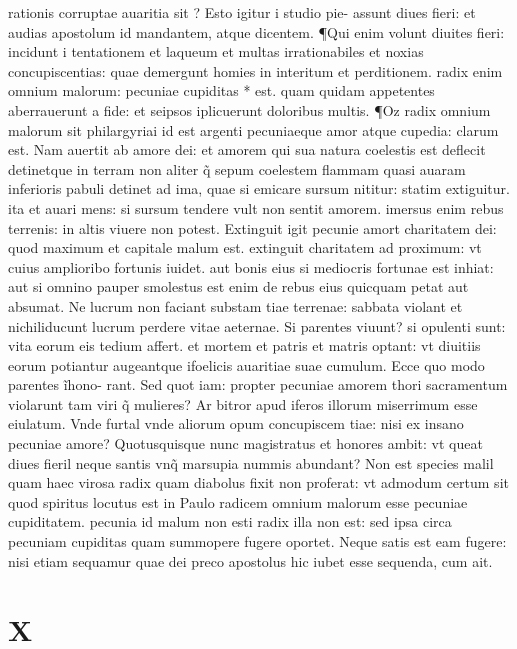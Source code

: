\documentclass{article}
\begin{document}
\begin{pages}
rationis corruptae auaritia sit ? Esto igitur i studio pie-  assunt diues fieri: et audias apostolum id mandantem, atque dicentem. ¶Qui enim volunt diuites fieri: incidunt i tentationem et laqueum et multas irrationabiles et noxias concupiscentias: quae demergunt homies in interitum et perditionem. radix enim omnium malorum: pecuniae cupiditas * est. quam quidam appetentes aberrauerunt a fide: et seipsos iplicuerunt doloribus multis. ¶Oz radix omnium malorum sit philargyriai id est argenti pecuniaeque amor atque cupedia: clarum est. Nam auertit ab amore dei: et amorem qui sua natura coelestis est deflecit detinetque in terram non aliter q̃ sepum coelestem flammam quasi auaram inferioris pabuli detinet ad ima, quae si emicare sursum nititur: statim extiguitur. ita et auari mens: si sursum tendere vult non sentit amorem. imersus enim rebus terrenis: in altis viuere non potest. Extinguit igit pecunie amort charitatem dei: quod maximum et capitale malum est. extinguit charitatem ad proximum: vt cuius amplioribo fortunis iuidet. aut bonis eius si mediocris fortunae est inhiat: aut si omnino pauper smolestus est enim de rebus eius quicquam petat aut absumat. Ne lucrum non faciant substam tiae terrenae: sabbata violant et nichiliducunt lucrum perdere vitae aeternae. Si parentes viuunt? si opulenti sunt: vita eorum eis tedium affert. et mortem et patris et matris optant: vt diuitiis eorum potiantur augeantque ifoelicis auaritiae suae cumulum. Ecce quo modo parentes ĩhono- rant. Sed quot iam: propter pecuniae amorem thori sacramentum violarunt tam viri q̃ mulieres? Ar bitror apud iferos illorum miserrimum esse eiulatum. Vnde furtal vnde aliorum opum concupiscem tiae: nisi ex insano pecuniae amore? Quotusquisque nunc magistratus et honores ambit: vt queat diues fieril neque santis vnq̃ marsupia nummis abundant? Non est species malil quam haec virosa radix quam diabolus fixit non proferat: vt admodum certum sit quod spiritus locutus est in Paulo radicem omnium malorum esse pecuniae cupiditatem. pecunia id malum non esti radix illa non est: sed ipsa circa pecuniam cupiditas quam summopere fugere oportet. Neque satis est eam fugere: nisi etiam sequamur quae dei preco apostolus hic iubet esse sequenda, cum ait.  \pend
\section*{X }

\end{pages}
\end{document}
